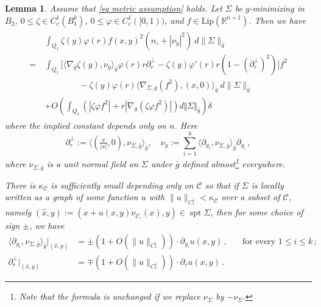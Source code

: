 \documentclass[11pt, letterpaper, reqno]{amsart}
\numberwithin{equation}{section}
\newtheorem{Lem}[Def]{Lemma}
\theoremstyle{remark}
\newcommand{\RR}{\mathbb{R}}
\newcommand{\cC}{\mathcal{C}}
\newcommand{\spt}{\operatorname{spt}}
\newcommand{\Lip}{\mathrm{Lip}}
\begin{document}
   \begin{Lem} \label{Lem_Noncon_1st variation}
     Assume that \eqref{eq metric assumption} holds. Let $\Sigma$ be $g$-minimizing in $B_2$, $0\leq \zeta\in C^1_c(B^k_1)$, $0\leq \varphi \in C^1_c([0, 1))$, and $f\in \Lip(\RR^{n+1})$. Then we have 
     \begin{align}
      \begin{split}
        & \int_{Q_1} \zeta(y)\varphi(r)f(x, y)^2 (n_\circ + |\nu_y|^2)\ d\|\Sigma\|_{\bar g} \\
        =\ & \int_{Q_1} \Big[ \langle \nabla_{\bar g}\zeta(y), \nu_y  \rangle_{\bar g} \varphi(r)r\partial_r^\perp - \zeta(y)\varphi'(r)r(1-(\partial_r^\perp)^2) \Big]f^2  \\ & \qquad \qquad - \zeta(y)\varphi(r) \langle \nabla_{\Sigma,\bar g} (f^2), (x, 0) \rangle_{\bar g} \ d\|\Sigma\|_{\bar g}  \\
& + O\left( \int_{Q_1} (  | \zeta\varphi f^2| + r |\nabla_{\bar g}(\zeta\varphi f^2)| ) d\Vert \Sigma\Vert_{\bar g} \right) \delta 
      \end{split} \label{Equ_Noncon_1st variation}
     \end{align}
     where the implied constant depends only on $n$. Here 
     \[
       \partial_r^\perp:= \langle (\displaystyle\tfrac{x}{|x|}, 0),  \nu_{\Sigma,\bar g} \rangle_{\bar g},  \quad  \nu_y := \displaystyle\sum_{i=1}^k \langle \partial_{y_i}, \nu_{\Sigma,\bar g} \rangle_{\bar g} \partial_{y_i}\,,  \] 
     where $\nu_{\Sigma, \bar g}$ is a unit normal field on $\Sigma$ under $\bar g$ defined almost\footnote{Note that the formula is unchanged if we replace $\nu_\Sigma$ by $-\nu_\Sigma$.} everywhere. 

     There is $\kappa_\cC$ is sufficiently small depending only on $\cC$ so that if $\Sigma$ is locally written as a graph of some function $u$ with $\|u\|_{C^1_*} < \kappa_\cC$ over a subset of $\cC$, namely $(\hat{x}, y):= (x+u(x, y)\nu_{\cC_\circ}(x), y)\in \spt \Sigma$, then for some choice of sign $\pm$, we have
     \begin{align}
        \langle \partial_{y_i}, \nu_{\Sigma,\bar g} \rangle_{\bar g}|_{(\hat{x}, y)} & = \pm (1+O(\|u\|_{C^1_*}))\cdot \partial_{y_i}u(x, y)\,, \;\;\;\;\; \text{ for every }1\leq i\leq k\,; \label{Equ_Noncon_partial_y^perp}\\
        \partial_r^\perp |_{(\hat{x}, y)} & = \mp (1+O(\|u\|_{C^1_*}))\cdot \partial_ru(x, y) \,. \label{Equ_Noncon_partial_r^perp}
     \end{align}
   \end{Lem}
\end{document}
